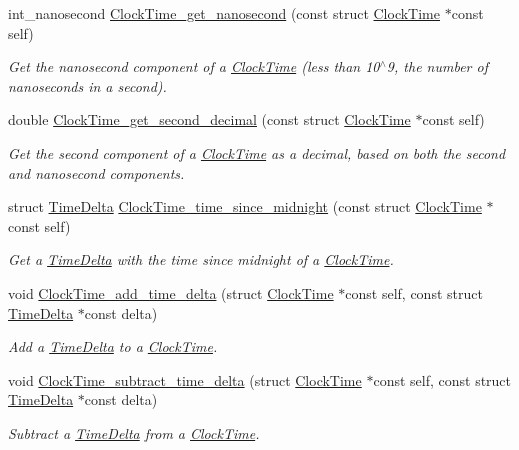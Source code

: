 \begin{DoxyCompactItemize}
int\-\_\-nanosecond \hyperlink{clock-time_8h_ad74a9b1b36f0fd4b4a739b69fb65869e}{\-Clock\-Time\-\_\-get\-\_\-nanosecond} (const struct \hyperlink{structClockTime}{\-Clock\-Time} $\ast$const self)
\begin{DoxyCompactList}\small\item\em \-Get the nanosecond component of a \hyperlink{structClockTime}{\-Clock\-Time} (less than 10$^\wedge$9, the number of nanoseconds in a second). \end{DoxyCompactList}\item 
double \hyperlink{clock-time_8h_a7cf42452da58eb906b00e92fe3efb159}{\-Clock\-Time\-\_\-get\-\_\-second\-\_\-decimal} (const struct \hyperlink{structClockTime}{\-Clock\-Time} $\ast$const self)
\begin{DoxyCompactList}\small\item\em \-Get the second component of a \hyperlink{structClockTime}{\-Clock\-Time} as a decimal, based on both the second and nanosecond components. \end{DoxyCompactList}\item 
struct \hyperlink{structTimeDelta}{\-Time\-Delta} \hyperlink{clock-time_8h_ace4db26641fe01b2edd311b09589ebbb}{\-Clock\-Time\-\_\-time\-\_\-since\-\_\-midnight} (const struct \hyperlink{structClockTime}{\-Clock\-Time} $\ast$const self)
\begin{DoxyCompactList}\small\item\em \-Get a \hyperlink{structTimeDelta}{\-Time\-Delta} with the time since midnight of a \hyperlink{structClockTime}{\-Clock\-Time}. \end{DoxyCompactList}\item 
void \hyperlink{clock-time_8h_adc2c863dfec0b56604b3153b226139fb}{\-Clock\-Time\-\_\-add\-\_\-time\-\_\-delta} (struct \hyperlink{structClockTime}{\-Clock\-Time} $\ast$const self, const struct \hyperlink{structTimeDelta}{\-Time\-Delta} $\ast$const delta)
\begin{DoxyCompactList}\small\item\em \-Add a \hyperlink{structTimeDelta}{\-Time\-Delta} to a \hyperlink{structClockTime}{\-Clock\-Time}. \end{DoxyCompactList}\item 
void \hyperlink{clock-time_8h_a5305df919aa0992ba4703f9b9f292a67}{\-Clock\-Time\-\_\-subtract\-\_\-time\-\_\-delta} (struct \hyperlink{structClockTime}{\-Clock\-Time} $\ast$const self, const struct \hyperlink{structTimeDelta}{\-Time\-Delta} $\ast$const delta)
\begin{DoxyCompactList}\small\item\em \-Subtract a \hyperlink{structTimeDelta}{\-Time\-Delta} from a \hyperlink{structClockTime}{\-Clock\-Time}. \end{DoxyCompactList}\item 

\end{DoxyCompactItemize}
